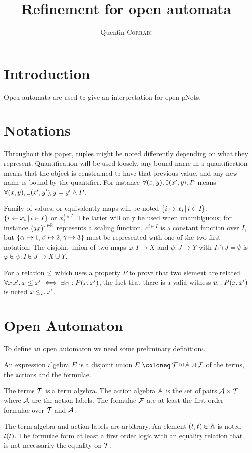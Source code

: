 \documentclass{article}
\title{Refinement for open automata}
\author{Quentin \textsc{Corradi}}
\begin{document}
\maketitle


\section{Introduction}
Open automata are used to give an interpretation for open pNets.


\section{Notations}
Throughout this paper, tuples might be noted differently depending on what they represent.
Quantification will be used loosely, any bound name in a quantification means that the object is constrained to have that previous value, and any new name is bound by the quantifier.
For instance \(\forall \mpar{x, y}, \exists \mpar{x', y}, P\) means \(\forall \mpar{x, y}, \exists \mpar{x', y'}, y = y' \wedge P\).

Family of values, or equivalently maps will be noted \(\mset{i \mapsto x_i}{i \in I}\), \(\mset{i \gets x_i}{i \in I}\) or \(x_i^{i \in I}\).
The latter will only be used when unambiguous; for instance \(\mpar{ax}^{x \in \setR}\) represents a scaling function, \(c^{i \in I}\) is a constant function over \(I\), but \(\mbrc{\alpha \mapsto 1, \beta \mapsto 2, \gamma \mapsto 3}\) must be represented with one of the two first notation.
The disjoint union of two maps \(\varphi: I \to X\) and \(\psi: J \to Y\) with \(I \cap J = \emptyset\) is \(\varphi \uplus \psi: I \uplus J \to X \cup Y\).

For a relation \(\wrel{}{}{}\) which uses a property \(P\) to prove that two element are related \(\forall x \, x', x \wrel{}{}{} x' \iff \exists w: P\mpar{x, x'}\), the fact that there is a valid witness \(w: P\mpar{x, x'}\) is noted \(\wrel{x}{x'}{w}\).


\section{Open Automaton}
To define an open automaton we need some preliminary definitions.
\begin{defi}
An expression algebra \(E\) is a disjoint union \(E \defobject \terms \uplus \actions \uplus \formulae\) of the terms, the actions and the formulae.

The terms \(\terms\) is a term algebra.
The action algebra \(\actions\) is the set of pairs \(\labels \times \terms\) where \(\labels\) are the action labels.
The formulae \(\formulae\) are at least the first order formulae over \(\terms\) and \(\labels\).
\end{defi}
The term algebra and action labels are arbitrary.
An element \(\mpar{l, t} \in \actions\) is noted \(l\mpar{t}\).
The formulae form at least a first order logic with an equality relation that is not necessarily the equality on \(\terms\).
\end{document}
